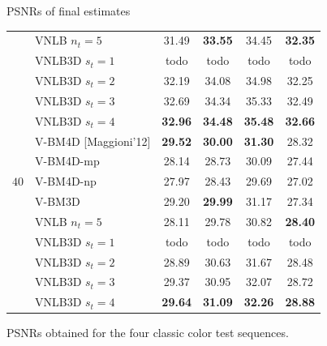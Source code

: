 \documentclass[mathserif, 8pt]{beamer}
\makeatletter
\newcounter{multipleslide}
\newcommand{\restoreframe}{%
\patchcmd{\beamer@@tmpl@footline}%
	{\themultipleslide}%
	{\insertframenumber}%
	{}%
	{}%
\setcounter{framenumber}{\value{multipleslide}}%
}
\newcommand{\best}[1]{\textbf{\textcolor{MyOrange}{#1}}}
\newcommand{\Best}[1]{\textbf{\textcolor{MyOrangeBrighter}{#1}}}
\makeatother
\begin{document}
\begin{frame}{PSNRs of final estimates}
\begin{center}
{\begin{tabular}{ c | l |c c c c}
			                      & VNLB $n_t = 5$       &       31.49  & \best{33.55} &       34.45  & \best{32.35} \\
			                      & VNLB3D $s_t = 1$     &       todo   &       todo   &       todo   &       todo   \\
			                      & VNLB3D $s_t = 2$     &       32.19  &       34.08  &       34.98  &       32.25  \\
			                      & VNLB3D $s_t = 3$     &       32.69  &       34.34  &       35.33  &       32.49  \\
			                      & VNLB3D $s_t = 4$     & \Best{32.96} & \Best{34.48} & \Best{35.48} & \Best{32.66} \\\hline
%
			\multirow{5}{*}{$40$} & V-BM4D [Maggioni'12] & \best{29.52} & \best{30.00} & \best{31.30} &       28.32  \\
			                      & V-BM4D-mp            &       28.14  &       28.73  &       30.09  &       27.44  \\
			                      & V-BM4D-np            &       27.97  &       28.43  &       29.69  &       27.02  \\
			                      & V-BM3D               &       29.20  & \best{29.99} &       31.17  &       27.34  \\
			                      & VNLB $n_t = 5$       &       28.11  &       29.78  &       30.82  & \best{28.40} \\
			                      & VNLB3D $s_t = 1$     &       todo   &       todo   &       todo   &       todo   \\
			                      & VNLB3D $s_t = 2$     &       28.89  &       30.63  &       31.67  &       28.48  \\
			                      & VNLB3D $s_t = 3$     &       29.37  &       30.95  &       32.07  &       28.72  \\
			                      & VNLB3D $s_t = 4$     & \Best{29.64} & \Best{31.09} & \Best{32.26} & \Best{28.88} \\\hline
		\end{tabular}}

		\bigskip

		PSNRs obtained for the four classic color test sequences.
	\end{center}
\end{frame}
\restoreframe
\end{document}
